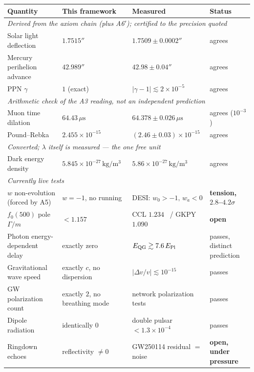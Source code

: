 \documentclass[pdflatex,sn-mathphys-num]{sn-jnl}
\theoremstyle{thmstyleone}
\theoremstyle{thmstylethree}
\theoremstyle{thmstyletwo}
\begin{document}
\begin{table}[htbp]
\centering
\small
\begin{tabular}{p{}p{}p{}p{}}
\toprule
Quantity & This framework & Measured & Status \\
\midrule
\multicolumn{4}{l}{\emph{Derived from the axiom chain (plus A6$'$); certified to the precision quoted}}\\
Solar light deflection & $1.7515''$ & $1.7509 \pm 0.0002''$ & agrees \\
Mercury perihelion advance & $42.989''$ & $42.98 \pm 0.04''$ & agrees \\
PPN $\gamma$ & $1$ (exact) & $|\gamma-1| \lesssim 2\times10^{-5}$~\cite{Bertotti2003} & agrees \\
\midrule
\multicolumn{4}{l}{\emph{Arithmetic check of the A3 reading, not an independent prediction}}\\
Muon time dilation & $64.43\,\mu\mathrm{s}$ & $64.378 \pm 0.026\,\mu\mathrm{s}$ & agrees ($10^{-3}$) \\
Pound--Rebka & $2.455\times10^{-15}$ & $(2.46\pm0.03)\times10^{-15}$ & agrees \\
\midrule
\multicolumn{4}{l}{\emph{Converted; $\lambda$ itself is measured — the one free unit}}\\
Dark energy density & $5.845\times10^{-27}\,\mathrm{kg/m^3}$ & $5.86\times10^{-27}\,\mathrm{kg/m^3}$~\cite{Planck2018} & agrees \\
\midrule
\multicolumn{4}{l}{\emph{Currently live tests}}\\
$w$ non-evolution (forced by A5) & $w=-1$, no running & DESI: $w_0>-1,\,w_a<0$ & \textbf{tension, $2.8$--$4.2\sigma$} \\
$f_0(500)$ pole $\Gamma/m$ & $<1.157$ & CCL $1.234$~\cite{CCL2006} / GKPY $1.090$~\cite{GKPY2011} & \textbf{open} \\
Photon energy-dependent delay & exactly zero & $E_{\rm QG}\gtrsim 7.6\,E_{\rm Pl}$ & passes, distinct prediction \\
Gravitational wave speed & exactly $c$, no dispersion & $|\Delta v/v|\lesssim10^{-15}$ & passes \\
GW polarization count & exactly $2$, no breathing mode & network polarization tests & passes \\
Dipole radiation & identically $0$ & double pulsar $<1.3\times10^{-4}$ & passes \\
Ringdown echoes & reflectivity $\neq 0$ & GW250114 residual $=$ noise & \textbf{open, under pressure} \\

\end{tabular}
\end{table}
\end{document}

